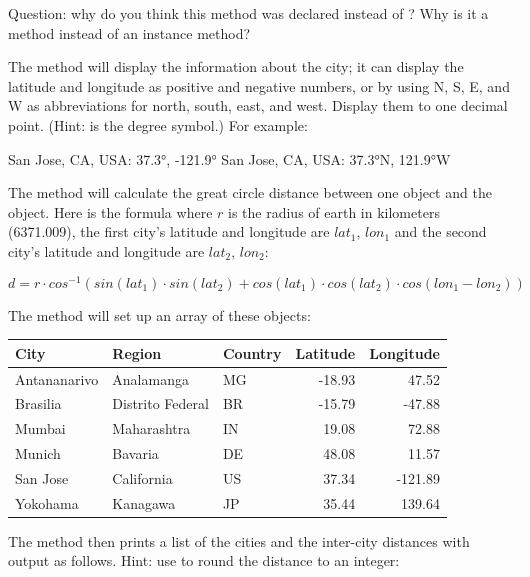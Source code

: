 \begin{exercise}
Question: why do you think this method was declared  instead of ? Why is it a  method instead of an instance method?

The  method will display the information about the city; it can display the latitude and longitude as positive and negative numbers, or by using N, S, E, and W as abbreviations for north, south, east, and west. Display them to one decimal point. (Hint:  is the degree symbol.) For example:

\begin{stdout}
San Jose, CA, USA: 37.3°, -121.9°
San Jose, CA, USA: 37.3°N, 121.9°W
\end{stdout}


The  method will calculate the great circle distance between one  object and the   object. Here is the formula where $r$ is the radius of earth in kilometers (6371.009), the first city's latitude and longitude are $lat_1$, $lon_1$ and the second city's latitude and longitude are  $lat_2$, $lon_2$:

\begin{equation*}
d = r\cdot cos^{-1}(sin(lat_1)\cdot sin(lat_2) + cos(lat_1)\cdot cos(lat_2)\cdot cos(lon_1 - lon_2))
\end{equation*}

The  method will set up an array of these  objects:

\begin{tabular}{|l|l|l|r|r|}
\hline
City & Region & Country & Latitude & Longitude \\ \hline
Antananarivo & Analamanga & MG & -18.93 & 47.52 \\ \hline
Brasilia & Distrito Federal & BR & -15.79 & -47.88 \\ \hline
Mumbai & Maharashtra & IN & 19.08 & 72.88 \\ \hline
Munich & Bavaria & DE & 48.08 & 11.57 \\ \hline
San Jose & California & US & 37.34 & -121.89 \\ \hline
Yokohama & Kanagawa & JP & 35.44 & 139.64 \\ \hline

\end{tabular}

The  method then prints a list of the cities and the inter-city distances with output as follows. Hint: use  to round the distance to an integer:


\end{exercise}
